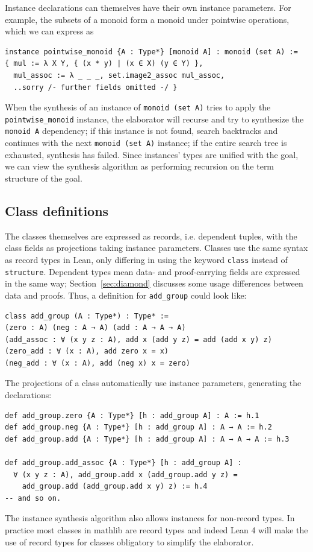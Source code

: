 \documentclass[a4paper,UKenglish,cleveref, autoref, thm-restate]{lipics-v2021}
\newcommand{\mathlib}{\textsf{mathlib}\xspace}
\begin{document}
Instance declarations can themselves have their own instance parameters.
For example, the subsets of a monoid form a monoid under pointwise operations, which we can express as
\begin{lstlisting}
instance pointwise_monoid {A : Type*} [monoid A] : monoid (set A) :=
{ mul := λ X Y, { (x * y) | (x ∈ X) (y ∈ Y) },
  mul_assoc := λ _ _ _, set.image2_assoc mul_assoc,
  ..sorry /- further fields omitted -/ }
\end{lstlisting}
When the synthesis of an instance of \lstinline{monoid (set A)} tries to apply the \lstinline{pointwise_monoid} instance,
the elaborator will recurse and try to synthesize the \lstinline{monoid A} dependency;
if this instance is not found, search backtracks and continues with the next \lstinline{monoid (set A)} instance;
if the entire search tree is exhausted, synthesis has failed.
Since instances' types are unified with the goal, we can view the synthesis algorithm as performing recursion on the term structure of the goal.

\subsection{Class definitions}
The classes themselves are expressed as records, i.e. dependent tuples, with the class fields as projections taking instance parameters.
Classes use the same syntax as record types in Lean, only differing in using the keyword \lstinline{class} instead of \lstinline{structure}.
Dependent types mean data- and proof-carrying fields are expressed in the same way;
Section~\ref{sec:diamond} discusses some usage differences between data and proofs.
Thus, a definition for \lstinline{add_group} could look like:
\begin{lstlisting}
class add_group (A : Type*) : Type* :=
(zero : A) (neg : A → A) (add : A → A → A)
(add_assoc : ∀ (x y z : A), add x (add y z) = add (add x y) z)
(zero_add : ∀ (x : A), add zero x = x)
(neg_add : ∀ (x : A), add (neg x) x = zero)
\end{lstlisting}
The projections of a class automatically use instance parameters, generating the declarations:
\begin{lstlisting}
def add_group.zero {A : Type*} [h : add_group A] : A := h.1
def add_group.neg {A : Type*} [h : add_group A] : A → A := h.2
def add_group.add {A : Type*} [h : add_group A] : A → A → A := h.3

def add_group.add_assoc {A : Type*} [h : add_group A] :
  ∀ (x y z : A), add_group.add x (add_group.add y z) =
    add_group.add (add_group.add x y) z) := h.4
-- and so on.
\end{lstlisting}
The instance synthesis algorithm also allows instances for non-record types.
In practice most classes in \mathlib are record types and indeed Lean 4 will make the use of record types for classes obligatory to simplify the elaborator.
\end{document}
